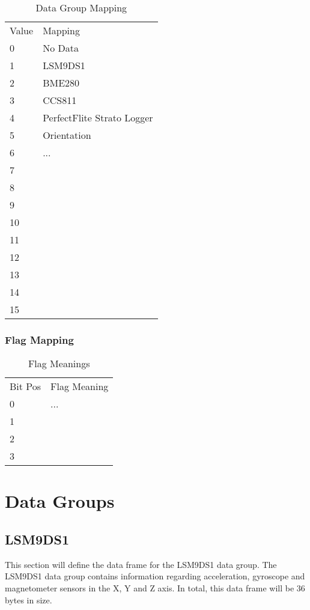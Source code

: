 \documentclass{article}
\begin{document}
  \begin{table}[h]
  \centering
  \caption{Data Group Mapping}
  \begin{tabular}{ll}
  Value & Mapping \\
  0     & No Data \\
  1     & LSM9DS1     \\
  2     & BME280        \\
  3     & CCS811        \\
  4     & PerfectFlite Strato Logger       \\
  5     & Orientation   \\
  6     &  ...        \\
  7     &         \\
  8     &         \\
  9     &         \\
  10    &         \\
  11    &         \\
  12    &         \\
  13    &         \\
  14    &         \\
  15    &        
  \end{tabular}
  \end{table}

  \subsubsection{Flag Mapping}
  
  \begin{table}[H]
  \centering
  \caption{Flag Meanings}
  \begin{tabular}{ll}
  Bit Pos & Flag Meaning \\
  0       & ...          \\
  1       &              \\
  2       &              \\
  3       &             
  \end{tabular}
  \end{table}
  
  \section{Data Groups}
  \subsection{LSM9DS1}
  This section will define the data frame for the LSM9DS1 data group. The LSM9DS1 data group contains information regarding acceleration, gyroscope and magnetometer sensors in the X, Y and Z axis. In total, this data frame will be 36 bytes in size. 
\end{document}
